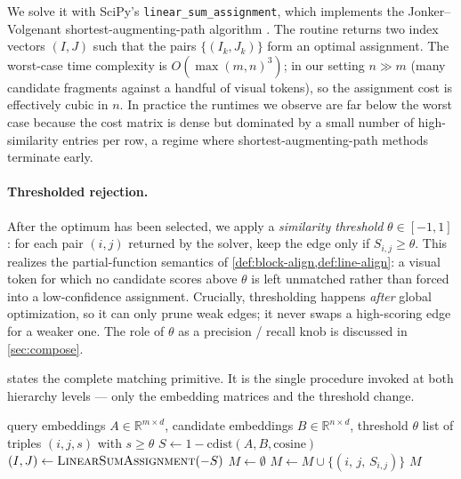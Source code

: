 \documentclass{article}
\theoremstyle{definition}
\begin{document}
We solve it with SciPy's \texttt{linear\_sum\_assignment}, which
implements the Jonker--Volgenant shortest-augmenting-path algorithm
\cite{jonker1987shortest, crouse2016implementing}.  The routine
returns two index vectors $(I, J)$ such that the pairs
$\{(I_k, J_k)\}$ form an optimal assignment.  The worst-case time
complexity is $O(\max(m, n)^3)$; in our setting $n \gg m$ (many
candidate fragments against a handful of visual tokens), so the
assignment cost is effectively cubic in $n$.  In practice the
runtimes we observe are far below the worst case because the cost
matrix is dense but dominated by a small number of high-similarity
entries per row, a regime where shortest-augmenting-path methods
terminate early.

\paragraph{Thresholded rejection.}
After the optimum has been selected, we apply a \emph{similarity
      threshold} $\theta \in [-1, 1]$: for each pair $(i, j)$ returned
by the solver, keep the edge only if $S_{i, j} \ge \theta$.  This
realizes the partial-function semantics of
\cref{def:block-align,def:line-align}: a visual token for which no
candidate scores above $\theta$ is left unmatched rather than forced
into a low-confidence assignment.  Crucially, thresholding happens
\emph{after} global optimization, so it can only prune weak edges; it
never swaps a high-scoring edge for a weaker one.  The role of
$\theta$ as a precision / recall knob is discussed in
\cref{sec:compose}.

 states the complete matching primitive.  It is the
single procedure invoked at both hierarchy levels --- only the
embedding matrices and the threshold change.

\begin{algorithm}[h]
      \caption{Max-weight bipartite matching with thresholding}
      \label{alg:match}
      \begin{algorithmic}[1]
            \Require query embeddings $A \in \mathbb{R}^{m\times d}$,
            candidate embeddings $B \in \mathbb{R}^{n\times d}$,
            threshold $\theta$
            \Ensure list of triples $(i, j, s)$ with $s \ge \theta$
            \State $S \gets 1 - \mathrm{cdist}(A, B, \text{cosine})$
            \State $(I, J) \gets \textsc{LinearSumAssignment}(-S)$
            \State $M \gets \emptyset$
            \State $M \gets M \cup \{(i,\, j,\, S_{i,j})\}$
            \EndIf
            \EndFor
            \State \Return $M$
      \end{algorithmic}
\end{algorithm}
\end{document}
